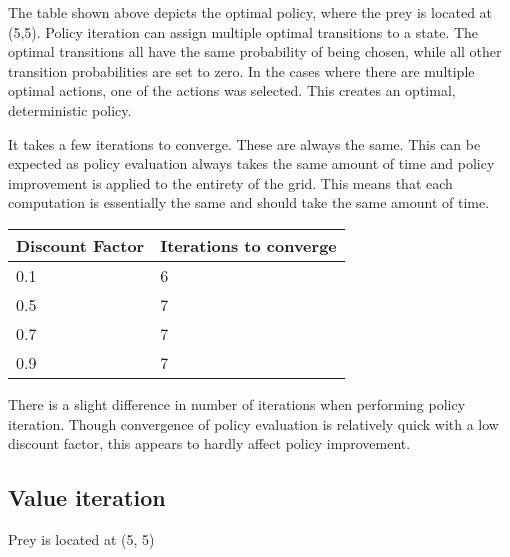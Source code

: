 \documentclass{article}
\begin{document}
The table shown above depicts the optimal policy, where the prey is located at (5,5). Policy iteration can assign multiple optimal transitions to a state. The optimal transitions all have the same probability of being chosen, while all other transition probabilities are set to zero. In the cases where there are multiple optimal actions, one of the actions was selected. This creates an optimal, deterministic policy.



It takes a few iterations to converge. These are always the same. This can be expected as policy evaluation always takes the same amount of time and policy improvement is applied to the entirety of the grid. This means that each computation is essentially the same and should take the same amount of time.

\begin{center}
	\begin{tabular}{ l || l }
		Discount Factor & Iterations to converge \\ 
		\hline
		0.1 & 6 \\
		0.5 & 7 \\
		0.7 & 7 \\
		0.9 & 7 \\	
	\end{tabular}
\end{center}
There is a slight difference in number of iterations when performing policy iteration. Though convergence of policy evaluation is relatively quick with a low discount factor, this appears to hardly affect policy improvement.

\subsection*{Value iteration}


Prey is located at (5, 5)
\end{document}
